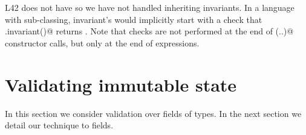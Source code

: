 

L42 does not have \Q@extends@ so we have not handled inheriting invariants.
In a language with sub-classing, invariant's would implicitly start with a check that \Q@super.invariant()@ returns \Q@true@.
Note that \Q@invariant@ checks are not performed at the end of \Q@super(..)@ constructor calls, but only at the end of \Q@new@ expressions.





%

\section{Validating immutable state}
\label{s:immState}
In this section we consider validation over fields of \Q@imm@ types.
In the next section we detail our technique to \Q@capsule@ fields.

